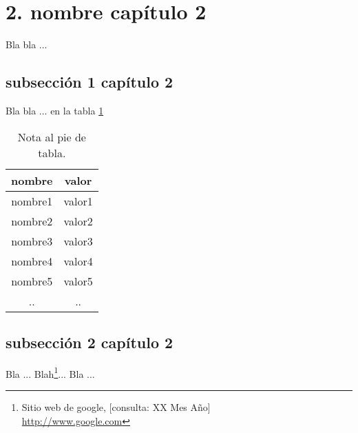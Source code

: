 \section{2. nombre capítulo 2}
Bla bla ...

\subsection{subsección 1 capítulo 2}

Bla bla ... en la tabla \ref{tab:xx}

\begin{table}[H]
\begin{center}
\begin{tabular}{c c} \hline
nombre & valor \\ \hline \hline
nombre1 & valor1 \\
nombre2 & valor2 \\
nombre3 & valor3 \\ 
nombre4 & valor4 \\
nombre5 & valor5 \\
.. & .. \\ \hline
\end{tabular}
	\caption{Nota al pie de tabla.}
	\label{tab:xx}
\end{center}
\end{table}

\subsection{subsección 2 capítulo 2}
Bla ... Blah\footnote[1]{Sitio web de google, [consulta: XX Mes A\~no] \\
 \url{http://www.google.com}}... Bla ... 
